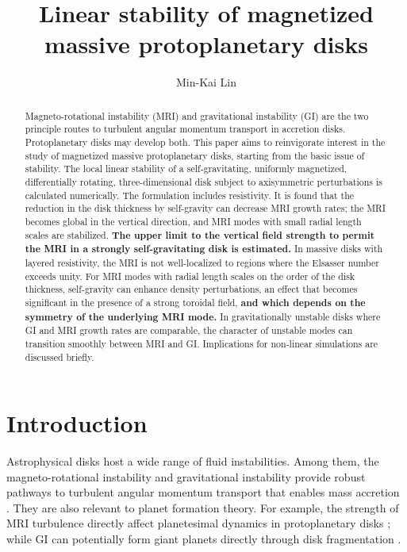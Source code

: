 \documentclass[iop]{emulateapj}
\begin{document}
\title{Linear stability of magnetized massive protoplanetary disks}


\author{Min-Kai Lin }%

\begin{abstract}
  Magneto-rotational instability (MRI) and gravitational instability
  (GI) are the two principle routes to turbulent angular momentum
  transport in accretion disks. Protoplanetary disks may develop 
  both. This paper aims to reinvigorate interest in the study of
  magnetized  massive protoplanetary disks, starting from the basic
  issue of stability. The local linear stability of a 
  self-gravitating, uniformly magnetized, differentially rotating, 
  three-dimensional disk subject to axisymmetric perturbations is
  calculated numerically. The formulation includes 
  resistivity. It is found that the reduction in the disk thickness
  by self-gravity can decrease MRI growth rates; the MRI
  becomes global in the vertical direction, and MRI modes 
  with small radial length scales are stabilized. {\bf The
    upper limit to the vertical field strength to permit the MRI
    in a strongly self-gravitating disk is estimated.} In massive
  disks with layered resistivity, the MRI is not well-localized
  to regions where the Elsasser number exceeds unity. For MRI modes
  with radial length scales on the order of the disk thickness, self-gravity 
  can enhance density perturbations, an effect that becomes 
  significant in the presence of a strong toroidal field, {\bf and
    which depends on the symmetry of the underlying MRI mode.} In
  gravitationally unstable disks where GI and MRI growth rates are
  comparable, the character of unstable modes can transition smoothly
  between MRI and GI. Implications for non-linear simulations are
  discussed briefly.   

%
\end{abstract}

\section{Introduction}
Astrophysical disks host a wide range of fluid instabilities. Among
them, the magneto-rotational instability \citep[MRI,][]{chandrasekhar61,
  balbus91,balbus98} 
and gravitational instability \citep[GI, ][]{toomre64,goldreich65a,goldreich65b} 
provide robust pathways to turbulent angular momentum transport that
enables mass accretion \citep[][ 
  and references therein]{balbus99,armitage11,turner14}.   
They are also relevant to planet formation theory. For example,
the strength of MRI turbulence directly affect planetesimal dynamics
in protoplanetary disks \citep{yang12,gressel12}; while GI can
potentially form giant planets directly through disk fragmentation
\citep{boss97,boss98,gammie01,voro13,helled14}. 
\end{document}
